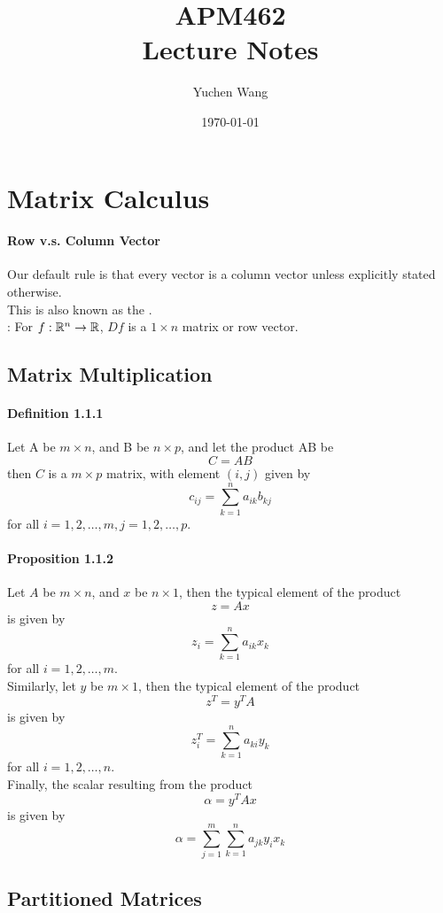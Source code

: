 \documentclass[11pt]{article}
\title{APM462 \\ Lecture Notes}
\author{Yuchen Wang}
\date{\today}
\begin{document}
    \maketitle
    \tableofcontents
    \newpage
    
\section{Matrix Calculus}
\paragraph{Row v.s. Column Vector}
Our default rule is that every vector is a column vector unless explicitly stated otherwise. \\
This is also known as the . \\
: For $f: \mathbb{R}^n \rightarrow \mathbb{R}$, $Df$ is a $ 1 \times n$ matrix or row vector.

\subsection{Matrix Multiplication}
\paragraph{Definition 1.1.1}
Let A be $m \times n$, and B be $n \times p$, and let the product AB be
$$C = AB$$
then $C$ is a $m \times p$ matrix, with element $(i,j)$ given by
$$c_{ij} = \sum_{k=1}^n a_{ik}b_{kj}$$
for all $i = 1, 2, \hdots, m, j = 1,2,\hdots,p$.
\paragraph{Proposition 1.1.2}
Let $A$ be $m \times n$, and $x$ be $n \times 1$, then the typical element of the product
$$ z = Ax$$
is given by
$$z_i = \sum_{k=1}^n a_{ik}x_k$$
for all $i= 1,2,\hdots,m$.\\
Similarly, let $y$ be $m \times 1$, then the typical element of the product
$$z^T = y^TA$$
is given by
$$ z_i^T = \sum_{k=1}^n a_{ki}y_k$$
for all $i = 1, 2,\hdots, n$.  \\
Finally, the scalar resulting from the product
$$\alpha = y^T A x$$
is given by
$$\alpha = \sum_{j=1}^m\sum_{k=1}^n a_{jk}y_i x_k$$

\subsection{Partitioned Matrices}
\end{document}
